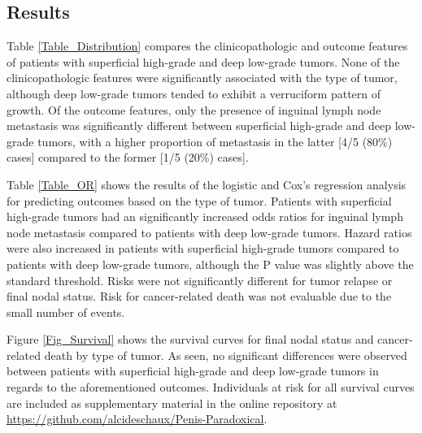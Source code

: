 \documentclass[11pt,letterpaper]{article}\usepackage[]{graphicx}\usepackage[]{color}
\begin{document}
\begin{multicols}{2}
\section*{Results}
Table \ref{Table_Distribution} compares the clinicopathologic and outcome features of patients with superficial high-grade and deep low-grade tumors. None of the clinicopathologic features were significantly associated with the type of tumor, although deep low-grade tumors tended to exhibit a verruciform pattern of growth. Of the outcome features, only the presence of inguinal lymph node metastasis was significantly different between superficial high-grade and deep low-grade tumors, with a higher proportion of metastasis in the latter [4/5 (80\%) cases] compared to the former [1/5 (20\%) cases].

Table \ref{Table_OR} shows the results of the logistic and Cox's regression analysis for predicting outcomes based on the type of tumor. Patients with superficial high-grade tumors had an significantly increased odds ratios for inguinal lymph node metastasis compared to patients with deep low-grade tumors. Hazard ratios were also increased in patients with superficial high-grade tumors compared to patients with deep low-grade tumors, although the P value was slightly above the standard threshold. Risks were not significantly different for tumor relapse or final nodal status. Risk for cancer-related death was not evaluable due to the small number of events.

Figure \ref{Fig_Survival} shows the survival curves for final nodal status and cancer-related death by type of tumor. As seen, no significant differences were observed between patients with superficial high-grade and deep low-grade tumors in regards to the aforementioned outcomes. Individuals at risk for all survival curves are included as supplementary material in the online repository at \url{https://github.com/alcideschaux/Penis-Paradoxical}.


\end{multicols}
\end{document}
